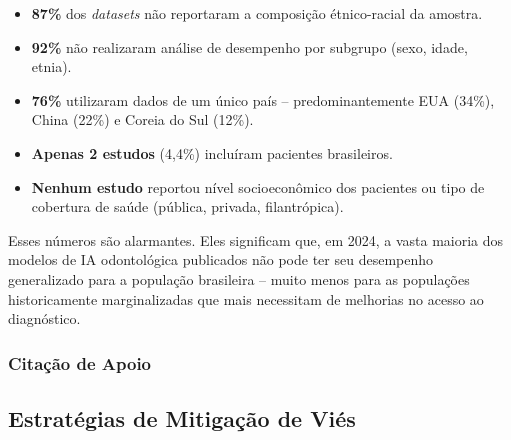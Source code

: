 \begin{itemize}
  \item \textbf{87\%} dos \textit{datasets} não reportaram a composição
    étnico-racial da amostra.
  \item \textbf{92\%} não realizaram análise de desempenho por subgrupo (sexo,
    idade, etnia).
  \item \textbf{76\%} utilizaram dados de um único país -- predominantemente
    EUA (34\%), China (22\%) e Coreia do Sul (12\%).
  \item \textbf{Apenas 2 estudos} (4,4\%) incluíram pacientes brasileiros.
  \item \textbf{Nenhum estudo} reportou nível socioeconômico dos pacientes ou
    tipo de cobertura de saúde (pública, privada, filantrópica).
\end{itemize}

Esses números são alarmantes. Eles significam que, em 2024, a vasta maioria dos
modelos de IA odontológica publicados não pode ter seu desempenho generalizado
para a população brasileira -- muito menos para as populações historicamente
marginalizadas que mais necessitam de melhorias no acesso ao diagnóstico.

\subsubsection{Citação de Apoio}


\subsection{Estratégias de Mitigação de Viés}

